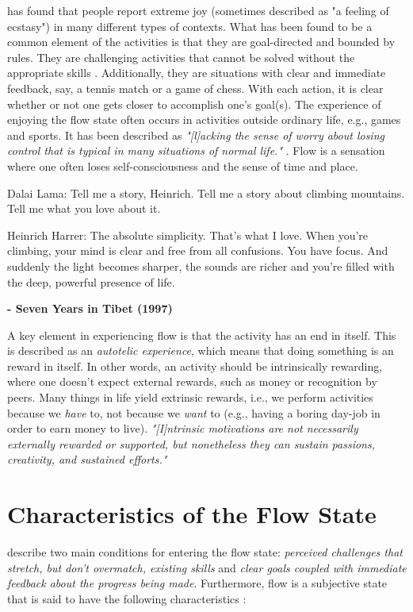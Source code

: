 \cite{flow} has found that people report extreme joy (sometimes described as "a feeling of ecstasy") in many different types of contexts. What has been found to be a common element of the activities is that they are goal-directed and bounded by rules. They are challenging activities that cannot be solved without the appropriate skills \citep{flow}. Additionally, they are situations with clear and immediate feedback, say, a tennis match or a game of chess. With each action, it is clear whether or not one gets closer to accomplish one's goal(s). The experience of enjoying the flow state often occurs in activities outside ordinary life, e.g., games and sports. It has been described as \textit{"[l]acking the sense of worry about losing control that is typical in many situations of normal life."} \citep{flow}. Flow is a sensation where one often loses self-consciousness and the sense of time and place.

\begin{fancyquotes}
Dalai Lama: Tell me a story, Heinrich. Tell me a story about climbing mountains. Tell me what you love about it.

Heinrich Harrer: The absolute simplicity. That's what I love. When you're climbing, your mind is clear and free from all confusions. You have focus. And suddenly the light becomes sharper, the sounds are richer and you're filled with the deep, powerful presence of life. 

\textbf{- Seven Years in Tibet (1997)}
\end{fancyquotes}

A key element in experiencing flow is that the activity has an end in itself. This is described as an \textit{autotelic experience}, which means that doing something is an reward in itself. In other words, an activity should be intrinsically rewarding, where one doesn't expect external rewards, such as money or recognition by peers. Many things in life yield extrinsic rewards, i.e., we perform activities because we \textit{have} to, not because we \textit{want} to (e.g., having a boring day-job in order to earn money to live). \textit{"[I]ntrinsic motivations are not necessarily externally rewarded or supported, but nonetheless they can sustain passions, creativity, and sustained efforts."} \citep{sdt_website}

\section{Characteristics of the Flow State} \label{char}
\cite{flowTwo} describe two main conditions for entering the flow state: \textit{perceived challenges that stretch, but don't overmatch, existing skills} and \textit{clear goals coupled with immediate feedback about the progress being made}. Furthermore, flow is a subjective state that is said to have the following characteristics \citep{flowTwo}:

